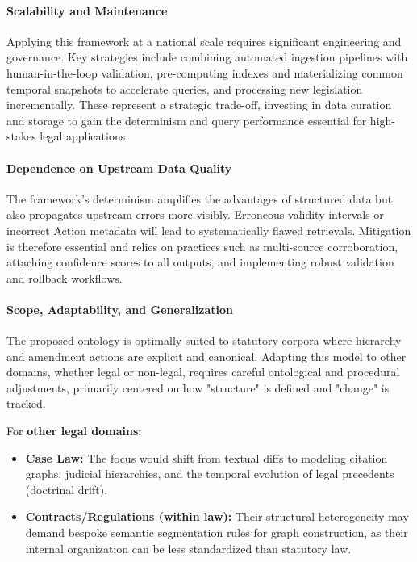 \documentclass[11pt]{article}
\begin{document}
\paragraph{Scalability and Maintenance}
Applying this framework at a national scale requires significant engineering and governance. Key strategies include combining automated ingestion pipelines with human-in-the-loop validation, pre-computing indexes and materializing common temporal snapshots to accelerate queries, and processing new legislation incrementally. These represent a strategic trade-off, investing in data curation and storage to gain the determinism and query performance essential for high-stakes legal applications.

\paragraph{Dependence on Upstream Data Quality}
The framework's determinism amplifies the advantages of structured data but also propagates upstream errors more visibly. Erroneous validity intervals or incorrect Action metadata will lead to systematically flawed retrievals. Mitigation is therefore essential and relies on practices such as multi-source corroboration, attaching confidence scores to all outputs, and implementing robust validation and rollback workflows.

\paragraph{Scope, Adaptability, and Generalization}
The proposed ontology is optimally suited to statutory corpora where hierarchy and amendment actions are explicit and canonical. Adapting this model to other domains, whether legal or non-legal, requires careful ontological and procedural adjustments, primarily centered on how "structure" is defined and "change" is tracked.

For \textbf{other legal domains}:
\begin{itemize}[noitemsep, topsep=0pt]
    \item \textbf{Case Law:} The focus would shift from textual diffs to modeling citation graphs, judicial hierarchies, and the temporal evolution of legal precedents (doctrinal drift).
    \item \textbf{Contracts/Regulations (within law):} Their structural heterogeneity may demand bespoke semantic segmentation rules for graph construction, as their internal organization can be less standardized than statutory law.
\end{itemize}
\end{document}
